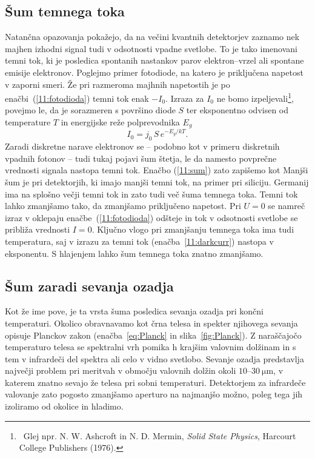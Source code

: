 \subsection*{Šum temnega toka} 
Natančna opazovanja pokažejo, da na večini kvantnih detektorjev
zaznamo nek majhen izhodni signal tudi v odsotnosti vpadne svetlobe. 
To je tako imenovani temni tok, ki je posledica
spontanih nastankov parov elektron--vrzel ali spontane emisije elektronov. 
Poglejmo primer fotodiode, na katero je priključena napetost v zaporni smeri. 
Že pri razmeroma majhnih napetostih je po enačbi~(\ref{11:fotodioda}) temni tok enak $-I_0$. 
Izraza za $I_0$ ne bomo izpeljevali\footnote{~Glej npr.
N. W. Ashcroft in N. D. Mermin, {\it Solid State Physics}, Harcourt 
College Publishers (1976).}, povejmo le, da je 
sorazmeren s površino diode $S$ ter eksponentno odvisen od temperature
$T$ in energijske reže polprevodnika $E_g$
\begin{equation}
I_0 = j_0\, S\, e^{-E_g/kT}\!.
\label{11:darkcurr}
\end{equation}
Zaradi diskretne narave elektronov se -- podobno
kot v primeru diskretnih vpadnih fotonov -- tudi tukaj pojavi šum štetja, le da 
namesto povprečne vrednosti signala nastopa temni tok. 
Enačbo (\ref{11:sum}) zato zapišemo kot 
Manjši šum je pri detektorjih, ki imajo manjši temni tok, na 
primer pri siliciju. Germanij  ima 
na splošno večji temni tok in zato tudi več šuma temnega toka. 
Temni tok lahko zmanjšamo tako, da zmanjšamo priključeno napetost.
Pri $U=0$ se namreč izraz v oklepaju enačbe~(\ref{11:fotodioda}) odšteje in
tok v odsotnosti svetlobe se približa vrednosti $I=0$. Ključno
vlogo pri zmanjšanju temnega toka ima tudi temperatura, saj v izrazu za
temni tok (enačba~\ref{11:darkcurr}) nastopa v eksponentu. 
S hlajenjem lahko šum temnega toka znatno zmanjšamo. 

\subsection*{Šum zaradi sevanja ozadja}
Kot že ime pove, je ta vrsta šuma posledica sevanja ozadja pri končni temperaturi.
Okolico obravnavamo kot črna telesa 
in spekter njihovega sevanja opisuje Planckov 
zakon (enačba~\ref{eq:Planck} in slika~\ref{fig:Planck}). Z naraščajočo temperaturo telesa se 
spektralni vrh pomika h krajšim valovnim dolžinam in s tem 
v infrardeči del spektra ali celo v vidno svetlobo. 
Sevanje ozadja predstavlja največji problem pri meritvah v
območju valovnih dolžin okoli $10$--$30~\si{\micro\meter}$, v katerem znatno sevajo že telesa 
pri sobni temperaturi. Detektorjem za infrardeče valovanje zato pogosto zmanjšamo aperturo 
na najmanjšo možno, poleg tega jih izoliramo od okolice in hladimo. 

